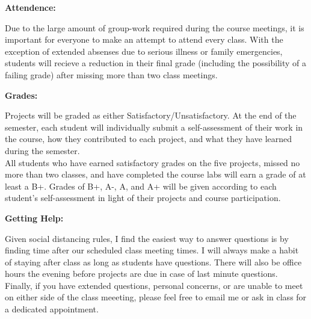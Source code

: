 \documentclass[12pt, a4paper]{article}
\begin{document}
\vspace{12pt}

\textbf{Attendence:} \vspace{6pt}

Due to the large amount of group-work required during the course meetings, it is
important for everyone to make an attempt to attend every class. With the
exception of extended absenses due to serious illness or family emergencies,
students will recieve a reduction in their final grade (including the
possibility of a failing grade) after missing more than two class meetings.

\vspace{12pt}

\textbf{Grades:} \vspace{6pt}

Projects will be graded as either Satisfactory/Unsatisfactory. At the end of
the semester, each student will individually submit a self-assessment of their
work in the course, how they contributed to each project, and what they have
learned during the semester.\\

All students who have earned satisfactory grades on the five projects, missed
no more than two classes, and have completed the course labs will earn a grade
of at least a B+. Grades of B+, A-, A, and A+ will be given according to each
student's self-assessment in light of their projects and course participation.

\vspace{12pt}

\textbf{Getting Help:} \vspace{6pt}

Given social distancing rules, I find the easiest way to answer questions
is by finding time after our scheduled class meeting times. I will always make
a habit of staying after class as long as students have questions. There will
also be office hours the evening before projects are due in case of last minute
questions. Finally, if you have extended questions, personal concerns, or are
unable to meet on either side of the class meeeting, please feel free to email
me or ask in class for a dedicated appointment.
\end{document}
